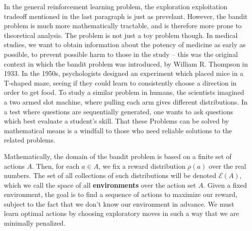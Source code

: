 In the general reinforcement learning problem, the exploration exploitation tradeoff mentioned in the last paragraph is just as prevelant. However, the bandit problem is much more mathematically tractable, and is therefore more prone to theoretical analysis. The problem is not just a toy problem though. In medical studies, we want to obtain information about the potency of medicine as early as possible, to prevent possible harm to those in the study -- this was the original context in which the bandit problem was introduced, by William R. Thompson in 1933. In the 1950s, psychologists designed an experiment which placed mice in a T-shaped maze, seeing if they could learn to consistently choose a direction in order to get food. To study a similar problem in humans, the scientists imagined a two armed slot machine, where pulling each arm gives different distributions. In a test where questions are sequentially generated, one wants to ask questions which best evaluate a student's skill. That these Problems can be solved by mathematical means is a windfall to those who need reliable solutions to the related problems.

Mathematically, the domain of the bandit problem is based on a finite set of actions $A$. Then, for each $a \in A$, we fix a reward distribution $\rho(a)$ over the real numbers. The set of all collections of such distributions will be denoted $\mathcal{E}(A)$, which we call the space of all {\bf environments} over the action set $A$. Given a fixed environment, the goal is to find a sequence of actions to maximize our reward, subject to the fact that we don't know our environment in advance. We must learn optimal actions by choosing exploratory moves in such a way that we are minimally penalized.

